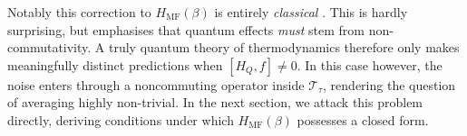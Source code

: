 Notably this correction to  $H_{\mathrm{MF}}(\beta)$ is entirely \emph{classical} \cite{mccaulMeanForceHamiltoniansInfluence2026}. This is hardly surprising, but emphasises that quantum effects \emph{must} stem from non-commutativity. A truly quantum theory of thermodynamics therefore only makes meaningfully distinct predictions when $[H_Q,f]\neq 0$. In this case however, the noise enters through a noncommuting operator inside $\mathcal T_\tau$, rendering the question of averaging highly non-trivial. In the next section, we attack this problem directly, deriving conditions under which $H_{\mathrm{MF}}(\beta)$ possesses a closed form. 


